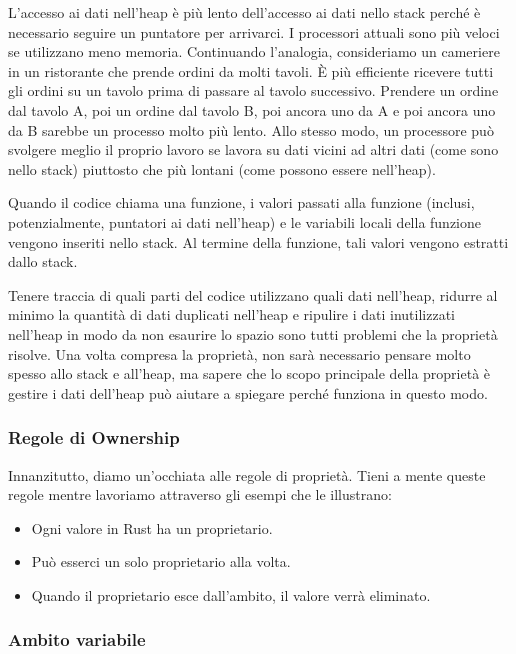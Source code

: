 \documentclass[11pt,a4paper]{article}
\begin{document}
\begin{mdframed}[hidealllines=true,backgroundcolor=blue!20,innerleftmargin=3pt,innerrightmargin=3pt,leftmargin=-5pt,rightmargin=-5pt]
L'accesso ai dati nell'heap è più lento dell'accesso ai dati nello stack perché è necessario seguire un puntatore per arrivarci. I processori attuali sono più veloci se utilizzano meno memoria. Continuando l'analogia, consideriamo un cameriere in un ristorante che prende ordini da molti tavoli. È più efficiente ricevere tutti gli ordini su un tavolo prima di passare al tavolo successivo. Prendere un ordine dal tavolo A, poi un ordine dal tavolo B, poi ancora uno da A e poi ancora uno da B sarebbe un processo molto più lento. Allo stesso modo, un processore può svolgere meglio il proprio lavoro se lavora su dati vicini ad altri dati (come sono nello stack) piuttosto che più lontani (come possono essere nell’heap).

Quando il codice chiama una funzione, i valori passati alla funzione (inclusi, potenzialmente, puntatori ai dati nell'heap) e le variabili locali della funzione vengono inseriti nello stack. Al termine della funzione, tali valori vengono estratti dallo stack.

Tenere traccia di quali parti del codice utilizzano quali dati nell'heap, ridurre al minimo la quantità di dati duplicati nell'heap e ripulire i dati inutilizzati nell'heap in modo da non esaurire lo spazio sono tutti problemi che la proprietà risolve. Una volta compresa la proprietà, non sarà necessario pensare molto spesso allo stack e all'heap, ma sapere che lo scopo principale della proprietà è gestire i dati dell'heap può aiutare a spiegare perché funziona in questo modo.

\end{mdframed}

\subsubsection{Regole di Ownership}
Innanzitutto, diamo un’occhiata alle regole di proprietà. Tieni a mente queste regole mentre lavoriamo attraverso gli esempi che le illustrano:

\begin{itemize}
\item Ogni valore in Rust ha un proprietario.
\item Può esserci un solo proprietario alla volta.
\item Quando il proprietario esce dall'ambito, il valore verrà eliminato.
\end{itemize}

\subsubsection{Ambito variabile}
\end{document}
